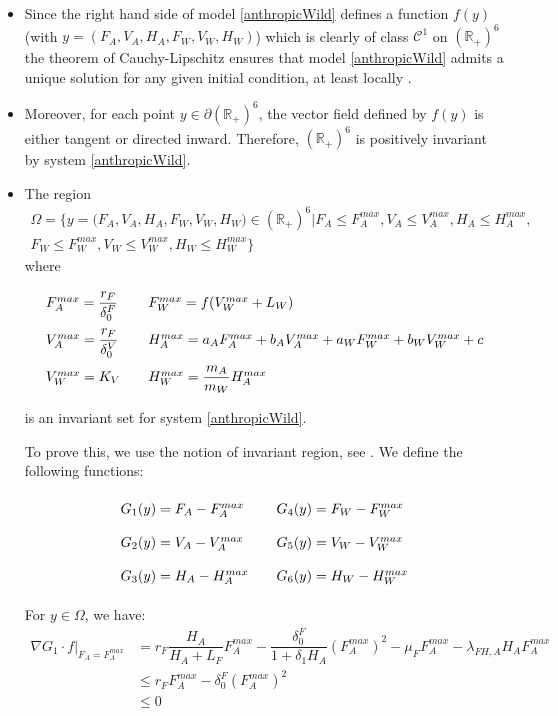 \documentclass{article}
\newcommand{\df}{\delta_0^F}
\newcommand{\dv}{\delta_0^V}
\begin{document}
\begin{itemize}
\item Since the right hand side of model \eqref{anthropicWild} defines a function $f(y)$ (with $y = (F_A, V_A, H_A, F_W, V_W, H_W)$) which is clearly of class $\mathcal{C}^1$ on $(\mathbb{R}_+)^6$ the theorem of Cauchy-Lipschitz ensures that model \eqref{anthropicWild} admits a unique solution for any given initial condition, at least locally \cite{walter_ordinary_1998}.
\item  Moreover, for each point $y \in \partial (\mathbb{R}_+)^6$, the vector field defined by $f(y)$ is either tangent or directed inward. Therefore, $(\mathbb{R}_+)^6$ is positively invariant by system \eqref{anthropicWild}.
\item The region 
\begin{multline*}
\Omega = \Big\{ y = \Big(F_A, V_A, H_A, F_W, V_W, H_W \Big) \in (\mathbb{R}_+)^6  \Big| F_A \leq F_A^{max}, V_A \leq V_A^{max}, H_A \leq H_A^{max}, \\ F_W \leq F_W^{max}, V_W \leq V_W^{max}, H_W \leq H_W^{max} \Big\}
\end{multline*}
where
$$
\centering
\def\arraystretch{2}
\begin{array}{lll}
F_A^{max} = \dfrac{r_F}{\df} & & F_W^{max} = f(V_W^{max} + L_W)
\\
V_A^{max} = \dfrac{r_F}{\dv} & & H_A^{max} = a_A F_A^{max} + b_A V_A^{max} + a_W F_W^{max} + b_W V_W^{max} + c \\
V^{max}_W = K_V && H_W^{max} = \dfrac{m_A}{m_W} H^{max}_A
\end{array} 
$$

is an invariant set for system \eqref{anthropicWild}.

To prove this, we use the notion of invariant region, see \cite{smoller_shock_1994}. We define the following functions:
$$
\centering
\def\arraystretch{2}
\begin{array}{lll}
G_1(y) = F_A - F_A^{max} & & G_4(y) = F_W - F_W^{max}
\\
G_2(y) = V_A - V_A^{max} & & G_5(y) = V_W - V_W^{max} \\
G_3(y) = H_A - H_A^{max} & & G_6(y) = H_W - H_W^{max} \\
\end{array} 
$$

For $y \in \Omega$, we have:
\begin{align*}
\nabla G_1 \cdot f |_{F_A = F_A^{max}} &= r_F  \dfrac{H_A}{H_A+L_F}F_A^{max} - \dfrac{\delta_0^F}{1 +\delta_1 H_A}(F_A^{max})^2-\mu_{F}F_A^{max}-\lambda_{FH,A}H_A F_A^{max} \\
& \leq r_F F_A^{max} - \df (F_A^{max})^2 \\
& \leq 0
\end{align*}


\end{itemize}
\end{document}
